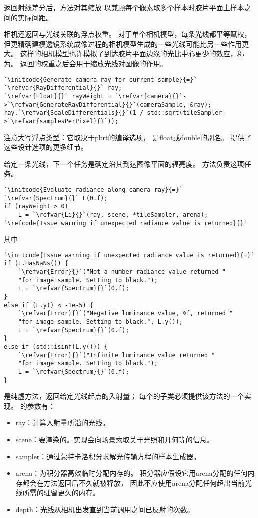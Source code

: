 返回射线差分后，方法对其缩放
以兼顾每个像素取多个样本时胶片平面上样本之间的实际间距。

相机还返回与光线关联的浮点权重。
对于单个相机模型，每条光线都平等赋权，
但更精确建模透镜系统成像过程的相机模型生成的一些光线可能比另一些作用更大。
这样的相机模型也许模拟了到达胶片平面边缘的光比中心更少的效应，称为。
返回的权重之后会用于缩放光线对图像的作用。
\begin{lstlisting}
`\initcode{Generate camera ray for current sample}{=}`
`\refvar{RayDifferential}{}` ray;
`\refvar{Float}{}` rayWeight = `\refvar{camera}{}`->`\refvar{GenerateRayDifferential}{}`(cameraSample, &ray);
ray.`\refvar{ScaleDifferentials}{}`(1 / std::sqrt(tileSampler->`\refvar{samplesPerPixel}{}`));
\end{lstlisting}

注意大写浮点类型：它取决于pbrt的编译选项，
是{\ttfamily float}或{\ttfamily double}的别名。
提供了这些设计选项的更多细节。

给定一条光线，下一个任务是确定沿其到达图像平面的辐亮度。
方法负责这项任务。
\begin{lstlisting}
`\initcode{Evaluate radiance along camera ray}{=}`
`\refvar{Spectrum}{}` L(0.f);
if (rayWeight > 0)
    L = `\refvar{Li}{}`(ray, scene, *tileSampler, arena);
`\refcode{Issue warning if unexpected radiance value is returned}{}`
\end{lstlisting}
其中
\begin{lstlisting}
`\initcode{Issue warning if unexpected radiance value is returned}{=}`
if (L.HasNaNs()) {
    `\refvar{Error}{}`("Not-a-number radiance value returned "
    "for image sample. Setting to black.");
    L = `\refvar{Spectrum}{}`(0.f);
}
else if (L.y() < -1e-5) {
    `\refvar{Error}{}`("Negative luminance value, %f, returned "
    "for image sample. Setting to black.", L.y());
    L = `\refvar{Spectrum}{}`(0.f);
}
else if (std::isinf(L.y())) {
    `\refvar{Error}{}`("Infinite luminance value returned "
    "for image sample. Setting to black.");
    L = `\refvar{Spectrum}{}`(0.f);
}
\end{lstlisting}
是纯虚方法，返回给定光线起点的入射量；
每个的子类必须提供该方法的一个实现。
的参数有：
\begin{itemize}
    \item {\ttfamily ray}：计算入射量所沿的光线。
    \item {\ttfamily scene}：要渲染的。实现会向场景索取关于光照和几何等的信息。
    \item {\ttfamily sampler}：通过蒙特卡洛积分求解光传输方程的样本生成器。
    \item {\ttfamily arena}：为积分器高效临时分配内存的。
          积分器应假设它用{\ttfamily arena}分配的任何内存都会在方法返回后不久就被释放，
          因此不应使用{\ttfamily arena}分配任何超出当前光线所需的驻留更久的内存。
    \item {\ttfamily depth}：光线从相机出发直到当前调用之间已反射的次数。
\end{itemize}

